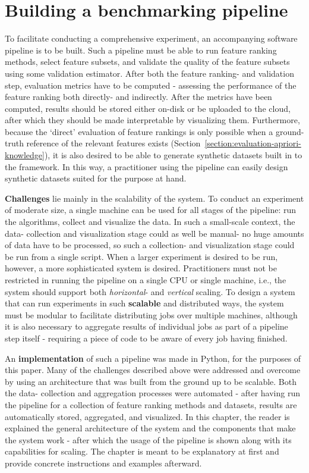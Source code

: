 \documentclass[../main.tex]{subfiles}
\begin{document}
\section{Building a benchmarking pipeline}\label{section:pipeline}
To facilitate conducting a comprehensive experiment, an accompanying software pipeline is to be built. Such a pipeline must be able to run feature ranking methods, select feature subsets, and validate the quality of the feature subsets using some validation estimator. After both the feature ranking- and validation step, evaluation metrics have to be computed - assessing the performance of the feature ranking both directly- and indirectly. After the metrics have been computed, results should be stored either on-disk or be uploaded to the cloud, after which they should be made interpretable by visualizing them. Furthermore, because the `direct' evaluation of feature rankings is only possible when a ground-truth reference of the relevant features exists (Section~\ref{section:evaluation-apriori-knowledge}), it is also desired to be able to generate synthetic datasets built in to the framework. In this way, a practitioner using the pipeline can easily design synthetic datasets suited for the purpose at hand.

\textbf{Challenges} lie mainly in the scalability of the system. To conduct an experiment of moderate size, a single machine can be used for all stages of the pipeline: run the algorithms, collect and visualize the data. In such a small-scale context, the data- collection and visualization stage could as well be manual- no huge amounts of data have to be processed, so such a collection- and visualization stage could be run from a single script. When a larger experiment is desired to be run, however, a more sophisticated system is desired. Practitioners must not be restricted in running the pipeline on a single CPU or single machine, i.e., the system should support both \textit{horizontal}- and \textit{vertical} scaling. To design a system that can run experiments in such \textbf{scalable} and distributed ways, the system must be modular to facilitate distributing jobs over multiple machines, although it is also necessary to aggregate results of individual jobs as part of a pipeline step itself - requiring a piece of code to be aware of every job having finished.

An \textbf{implementation} of such a pipeline was made in Python, for the purposes of this paper. Many of the challenges described above were addressed and overcome by using an architecture that was built from the ground up to be scalable. Both the data- collection and aggregation processes were automated - after having run the pipeline for a collection of feature ranking methods and datasets, results are automatically stored, aggregated, and visualized. In this chapter, the reader is explained the general architecture of the system and the components that make the system work - after which the usage of the pipeline is shown along with its capabilities for scaling. The chapter is meant to be explanatory at first and provide concrete instructions and examples afterward.
\end{document}
